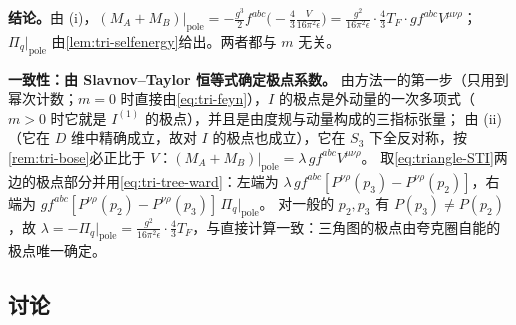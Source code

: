 \documentclass[UTF8,a4paper,11pt,fontset=fandol]{ctexart}
\makeatletter
\theoremstyle{cplain}
\theoremstyle{cdefinition}
\theoremstyle{cremark}
\renewcommand{\proofname}{证明}
\renewenvironment{proof}[1][\proofname]{\par\pushQED{\qed}\normalfont\topsep6\p@\@plus6\p@\relax
  \trivlist\item[\hskip\labelsep\itshape #1\hspace{0.5em}]\ignorespaces}{\popQED\endtrivlist\@endpefalse}
\numberwithin{equation}{section}
\makeatother
\begin{document}
\begin{proof}[{\cref{prop:triangle}(iv) 的证明}]
\smallskip\noindent\textbf{结论。}由 (i)，$(M_A+M_B)|_{\mathrm{pole}}=-\frac{g^3}{2}f^{abc}\bigl(-\frac43\frac{V}{16\pi^2\epsilon}\bigr)=\frac{g^2}{16\pi^2\epsilon}\cdot\frac43T_F\cdot g f^{abc}V^{\mu\nu\rho}$；
$\Pi_q|_{\mathrm{pole}}$ 由\cref{lem:tri-selfenergy}给出。两者都与 $m$ 无关。

\smallskip\noindent\textbf{一致性：由 Slavnov--Taylor 恒等式确定极点系数。}
由方法一的第一步（只用到幂次计数；$m=0$ 时直接由\cref{eq:tri-feyn}），$I$ 的极点是外动量的一次多项式（$m>0$ 时它就是 $I^{(1)}$ 的极点），并且是由度规与动量构成的三指标张量；
由 (ii)（它在 $D$ 维中精确成立，故对 $I$ 的极点也成立），它在 $S_3$ 下全反对称，按\cref{rem:tri-bose}必正比于 $V$：$(M_A+M_B)|_{\mathrm{pole}}=\lambda\,g f^{abc}V^{\mu\nu\rho}$。
取\cref{eq:triangle-STI}两边的极点部分并用\cref{eq:tri-tree-ward}：左端为 $\lambda\,g f^{abc}[P^{\nu\rho}(p_3)-P^{\nu\rho}(p_2)]$，右端为 $g f^{abc}[P^{\nu\rho}(p_2)-P^{\nu\rho}(p_3)]\,\Pi_q|_{\mathrm{pole}}$。
对一般的 $p_2,p_3$ 有 $P(p_3)\neq P(p_2)$，故 $\lambda=-\Pi_q|_{\mathrm{pole}}=\frac{g^2}{16\pi^2\epsilon}\cdot\frac43T_F$，与直接计算一致：三角图的极点由夸克圈自能的极点唯一确定。
\end{proof}

\subsection{讨论}\label{sec:triangle-discussion}
\end{document}
